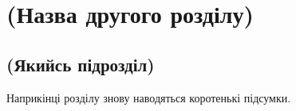 \chapter{(Назва другого розділу)}
\label{chap:theory}


\section{(Якийсь підрозділ)}



\chapconclude{\ref{chap:theory}}

Наприкінці розділу знову наводяться коротенькі підсумки.